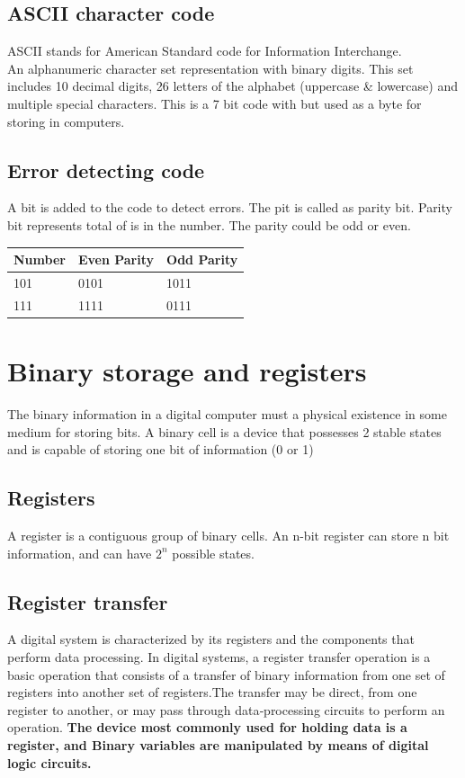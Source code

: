 \subsection{ASCII character code} 
ASCII stands for American Standard code for Information Interchange.\\
An alphanumeric character set representation with binary digits. This set includes 10 decimal digits, 26 letters of the alphabet (uppercase \& lowercase) and multiple special characters. This is a 7 bit code with but used as a byte for storing in computers. 

\subsection{Error detecting code}
A bit is added to the code to detect errors. The pit is called as parity bit. Parity bit represents total of is in the number. The parity could be odd or even.
\begin{table}[H]
\centering
\begin{tabular}{lll}
\hline
\multicolumn{1}{|l|}{\textbf{Number}} & \multicolumn{1}{l|}{\textbf{Even Parity}} & \multicolumn{1}{l|}{\textbf{Odd Parity}} \\ \hline
\multicolumn{1}{|l|}{101} & \multicolumn{1}{l|}{0101} & \multicolumn{1}{l|}{1011}\\ \hline
\multicolumn{1}{|l|}{111} & \multicolumn{1}{l|}{1111} & \multicolumn{1}{l|}{0111}\\ \hline
\end{tabular}
\end{table}

\clearpage
\section{Binary storage and registers}
The binary information in a digital computer must a physical existence in some medium for storing bits. A binary cell is a device that possesses 2 stable states and is capable of storing one bit of information (0 or 1)

\subsection{Registers} A register is a contiguous group of binary cells. An n-bit register can store n bit information, and can have \(2^{n}\) possible states. 

\subsection{Register transfer} 
A digital system is characterized by its registers and the components that perform data processing. In digital systems, a register transfer operation is a basic operation that consists of a transfer of binary information from one set of registers into another set of registers.The transfer may be direct, from one register to another, or may pass through data‐processing circuits to perform an operation. \textbf{The device most commonly used for holding data is a register, and Binary variables are manipulated by means of digital logic circuits.} 


